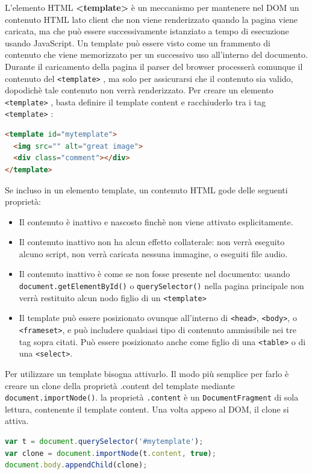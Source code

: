 L’elemento HTML \textbf{<template>} è un meccanismo per mantenere nel DOM un contenuto HTML lato client che non viene renderizzato quando la pagina viene caricata, ma che può essere successivamente istanziato a tempo di esecuzione usando JavaScript. Un template può essere visto come un frammento di contenuto che viene memorizzato per un successivo uso all’interno del documento. Durante il caricamento della pagina il parser del browser processerà comunque il contenuto del \texttt{<template>} , ma solo per assicurarsi che il contenuto sia valido, dopodichè tale contenuto non verrà renderizzato.
Per creare un elemento \texttt{<template>} , basta definire il template content e racchiuderlo tra i tag \texttt{<template>} :
\begin{lstlisting}[language=html]
<template id="mytemplate">
  <img src="" alt="great image">
  <div class="comment"></div>
</template>
\end{lstlisting}
Se incluso in un elemento template, un contenuto HTML gode delle seguenti proprietà: 
\begin{itemize}
\item Il contenuto è inattivo e nascosto finchè non viene attivato esplicitamente.
\item Il contenuto inattivo non ha alcun effetto collaterale: non verrà eseguito alcuno script, non verrà caricata nessuna immagine, o eseguiti file audio.
\item Il contenuto inattivo è come se non fosse presente nel documento: usando \texttt{document.getElementById()} o \texttt{querySelector()} nella pagina principale non verrà restituito alcun nodo figlio di un \texttt{<template>}
\item Il template può essere posizionato ovunque all’interno di \texttt{<head>}, \texttt{<body>}, o \texttt{<frameset>}, e può includere qualsiasi tipo di contenuto ammissibile nei tre tag sopra citati. Può essere posizionato anche come figlio di una \texttt{<table>} o di una \texttt{<select>}. 
\end{itemize}
Per utilizzare un template bisogna attivarlo. Il modo più semplice per farlo è creare un clone della proprietà .content del template mediante \texttt{document.importNode()}. la proprietà \texttt{.content} è un \texttt{DocumentFragment} di sola lettura, contenente il template content. Una volta appeso al DOM, il clone si attiva.
\begin{lstlisting}[language=javascript]
var t = document.querySelector('#mytemplate');
var clone = document.importNode(t.content, true);
document.body.appendChild(clone);
\end{lstlisting}

